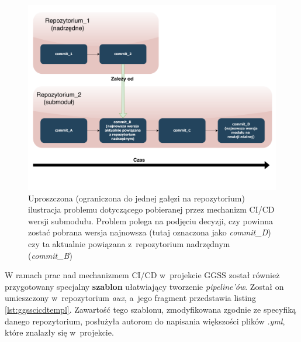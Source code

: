 \begin{figure}[H]
\centering
\includegraphics[width=\textwidth]{res/SubmodulesProblem}
\caption{Uproszczona (ograniczona do jednej gałęzi na repozytorium) ilustracja problemu dotyczącego pobieranej przez mechanizm CI/CD wersji submodułu. Problem polega na podjęciu decyzji, czy powinna zostać pobrana wersja najnowsza (tutaj oznaczona jako \textit{commit\_D}) czy ta aktualnie powiązana z~repozytorium nadrzędnym (\textit{commit\_B})}
\label{fig:submoduleProblem}
\end{figure}

\newpage

W ramach prac nad mechanizmem CI/CD w~projekcie GGSS został również przygotowany specjalny \textbf{szablon} ułatwiający tworzenie \textit{pipeline'ów}. Został on umieszczony w~repozytorium \textit{aux}, a~jego fragment przedstawia listing \ref{lst:ggsscicdtempl}. Zawartość tego szablonu, zmodyfikowana zgodnie ze specyfiką danego repozytorium, posłużyła autorom do napisania większości plików \textit{.yml}, które znalazły się w~projekcie.

